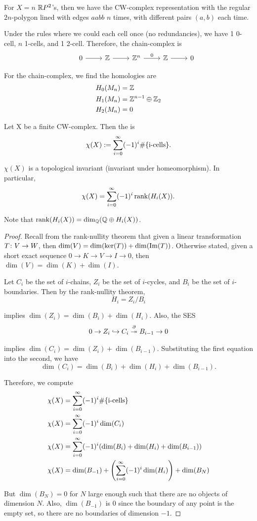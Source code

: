 \documentclass[11pt,leqno,oneside]{amsart}
\numberwithin{thm}{section}
\renewcommand{\d}{\partial}
\newcommand{\homl}[1][n]{H_{#1}}
\begin{document}
For $X = n$ ${\mathbb R} P^2$'s, then we have the CW-complex representation with the regular $2n$-polygon lined with edges $aabb$ $n$ times, with different pairs $(a,b)$ each time.

Under the rules where we could each cell once (no redundancies), we have 1 0-cell, $n$ 1-cells, and 1 2-cell.  Therefore, the chain-complex is
$$\begin{tikzcd}
  &0 \arrow[r, ""] &\Z \arrow[r, ""] &\Z^{n} \arrow[r, "0"] &\Z \arrow[r, ""] &0
\end{tikzcd}$$

For the chain-complex, we find the homologies are
\begin{align}
  \homl[0](M_n) &= \Z \\
  \homl[1](M_n) &= \Z^{n - 1} \dsum \Z_2 \\
  \homl[2](M_n) &= 0
\end{align}

\begin{defn}
  Let X be a finite CW-complex.  Then the  is
  $$\chi(X) := \sum_{i=0}^\infty (-1)^i \#\{\text{i-cells}\}. $$
\end{defn}

\begin{thm}
  $\chi(X)$ is a topological invariant (invariant under homeomorphism).  In particular,
  $$ \chi(X) = \sum_{i=0}^\infty (-1)^i \operatorname{rank}(H_i(X)). $$

  Note that $\operatorname{rank}(H_i(X)) = \dim_{{\mathbb Q}}({\mathbb Q} \oplus H_i(X))$.
\end{thm}
\begin{proof}
  Recall from the rank-nullity theorem that given a linear transformation $T \colon V \to W$, then $\dim(V) = \dim(\ker(T)) + \dim(\operatorname{Im}(T))$.  Otherwise stated, given a short exact sequence $0 \to K \to V \to I \to 0$, then $\dim(V) = \dim(K) + \dim(I)$.

  Let $C_i$ be the set of $i$-chains, $Z_i$ be the set of $i$-cycles, and $B_i$ be the set of $i$-boundaries.  Then by the rank-nullity theorem,
  $$ H_i = Z_i/B_i $$

  implies $\dim(Z_i) = \dim(B_i) + \dim(H_i)$.  Also, the SES
  $$ 0 \to Z_i \into C_i \overset{\d}{\onto} B_{i-1} \to 0 $$

  implies $\dim(C_i) = \dim(Z_i) + \dim(B_{i-1})$.  Substituting the first equation into the second, we have
  $$ \dim(C_i) = \dim(B_i) + \dim(H_i) + \dim(B_{i-1}).$$

  Therefore, we compute
  \begin{align}
    \chi(X) &= \sum_{i=0}^\infty (-1)^i \#\{\text{i-cells}\} \\
    \chi(X) &= \sum_{i=0}^\infty (-1)^i \dim(C_i) \\
    \chi(X) &= \sum_{i=0}^\infty (-1)^i (\dim(B_i) + \dim(H_i) + \dim(B_{i-1})) \\
    \chi(X) &= \dim(B_{-1}) + \left(\sum_{i=0}^\infty (-1)^i \dim(H_i)\right) + \dim(B_N)
  \end{align}

  But $\dim(B_N) = 0$ for $N$ large enough such that there are no objects of dimension $N$.  Also, $\dim(B_{-1})$ is 0 since the boundary of any point is the empty set, so there are no boundaries of dimension $-1$.
\end{proof}
\end{document}

